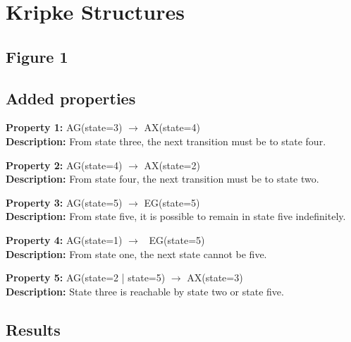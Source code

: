 \documentclass[11pt]{article}
\begin{document}
\section{Kripke Structures} 

\subsection{Figure 1}
	\subsection{Added properties}
	
		\textbf{Property 1:} 	AG(state=3) $\to$ AX(state=4) 	\\	
		\textbf{Description:} From state three, the next transition must be to state four. \\
		\vspace{12pt}
		
		\textbf{Property 2:} AG(state=4) $\to$ AX(state=2)\\ 
		\textbf{Description:} From state four, the next transition must be to state two. \\
		\vspace{12pt}
		
		\textbf{Property 3:} 	AG(state=5) $\to$ EG(state=5)\\ 
		\textbf{Description:} From state five, it is possible to remain in state five indefinitely. \\
		\vspace{12pt}
		
		\textbf{Property 4:} AG(state=1) $\to$ ~EG(state=5) \\
		\textbf{Description:} From state one, the next state cannot be five.\\
		\vspace{12pt}
		
		\textbf{Property 5:} AG(state=2 | state=5) $\to$ AX(state=3)  \\
		\textbf{Description:} State three is reachable by state two or state five.\\
	
	
	\subsection{Results}
\end{document}
